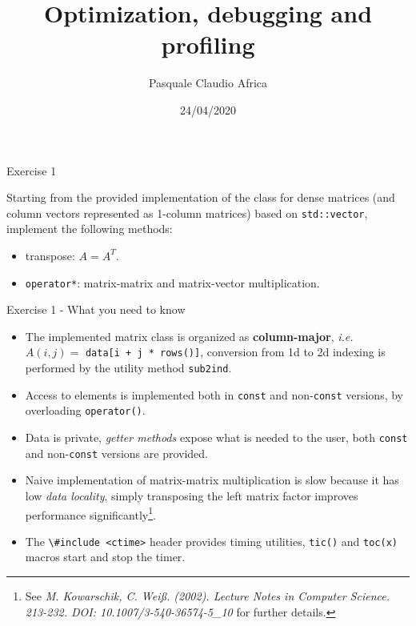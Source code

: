 \documentclass[10pt]{beamer}
\begin{document}
    \title{Optimization, debugging and profiling}
    \author{Pasquale Claudio Africa}
    \date{24/04/2020}

\begin{frame}
    \maketitle
\end{frame}

\begin{frame}{Exercise 1}

Starting from the provided implementation of the class for dense matrices (and column vectors represented as 1-column matrices) based on \lstinline{std::vector}, implement the following methods:
\begin{itemize}
\item transpose: $A = A^{T}$.
\item \lstinline{operator*}: matrix-matrix and matrix-vector multiplication.
\end{itemize}
\end{frame}

\begin{frame}{Exercise 1 - What you need to know}
\begin{itemize}
\item The implemented matrix class is organized as
      \textbf{column-major}, \textit{i.e.}
      $A(i, j) = $ \lstinline{data[i + j * rows()]}, 
      conversion from 1d to 2d indexing is performed by the utility
      method \lstinline{sub2ind}.\\[3mm]
\item Access to elements is implemented both in \texttt{const} and non-\texttt{const} versions, by overloading \lstinline{operator()}. \\[3mm]
\item Data is private, \textit{getter methods} expose what is needed to the user, both \texttt{const} and non-\texttt{const} versions are provided. \\[3mm]
\item Naive implementation of matrix-matrix multiplication is slow because it has low \textit{data locality}, simply transposing the left matrix factor improves performance significantly\footnote{See \textit{M. Kowarschik, C. Weiß. (2002). Lecture Notes in Computer Science. 213-232. DOI: 10.1007/3-540-36574-5\_10} for further details.}.\\[3mm]
\item The \lstinline{\#include <ctime>} header provides timing utilities, \lstinline{tic()} and \lstinline{toc(x)} macros start and stop the timer.
\end{itemize}
\end{frame}
\end{document}

